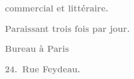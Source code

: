 \pstart
           \begin{otherlanguage}{french}\textcolor{gray}{\textbf{commercial et littéraire.}}\end{otherlanguage}\pend
           
\pstart
           \begin{otherlanguage}{french}\textcolor{gray}{\textbf{\textbf{Paraissant trois fois par jour.}}}\end{otherlanguage}\pend
           
\pstart
           \begin{otherlanguage}{french}\textcolor{gray}{\textbf{\textbf{Bureau à Paris}}}\end{otherlanguage}\pend
           
\pstart
           \begin{otherlanguage}{french}\textcolor{gray}{\textbf{\textbf{24. Rue Feydeau.}}}\end{otherlanguage}\pend
           
